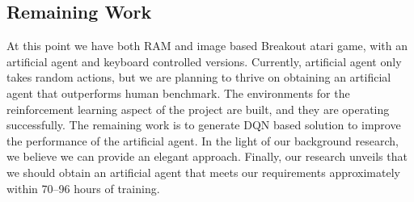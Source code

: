 \subsection{Remaining Work}
At this point we have both RAM and image based Breakout atari game, with an artificial agent and keyboard controlled versions. Currently, artificial agent only takes random actions, but we are planning to thrive on obtaining an artificial agent that outperforms human benchmark. The environments for the reinforcement learning aspect of the project are built, and they are operating successfully. The remaining work is to generate DQN based solution to improve the performance of the artificial agent. In the light of our background research, we believe we can provide an elegant approach. Finally, our research unveils that we should obtain an artificial agent that meets our requirements approximately within 70--96 hours of training.